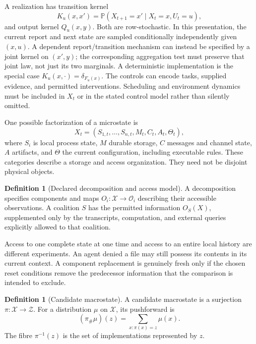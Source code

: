 \documentclass[11pt,letterpaper]{article}
\theoremstyle{plain}
\theoremstyle{definition}
\newtheorem{definition}[proposition]{Definition}
\theoremstyle{remark}
\newcommand{\X}{\mathcal X}
\newcommand{\Z}{\mathcal Z}
\newcommand{\Prob}{\mathbb P}
\newcommand{\push}{\pi_{\#}}
\begin{document}
A realization has transition kernel
\begin{equation}\label{eq:micro}
K_u(x,x')=\Prob(X_{t+1}=x'\mid X_t=x,U_t=u),
\end{equation}
and output kernel $Q_u(x,y)$. Both are row-stochastic. In this presentation, the current report and next state are sampled conditionally independently given $(x,u)$. A dependent report/transition mechanism can instead be specified by a joint kernel on $(x',y)$; the corresponding aggregation test must preserve that joint law, not just its two marginals. A deterministic implementation is the special case $K_u(x,\cdot)=\delta_{F_u(x)}$. The controls can encode tasks, supplied evidence, and permitted interventions. Scheduling and environment dynamics must be included in $X_t$ or in the stated control model rather than silently omitted.

One possible factorization of a microstate is
\[
X_t=(S_{1,t},\ldots,S_{n,t},M_t,C_t,A_t,\Theta_t),
\]
where $S_i$ is local process state, $M$ durable storage, $C$ messages and channel state, $A$ artifacts, and $\Theta$ the current configuration, including executable rules. These categories describe a storage and access organization. They need not be disjoint physical objects.

\begin{definition}[Declared decomposition and access model]\label{def:access}
A decomposition specifies components and maps $O_i:\X\to\mathcal O_i$ describing their accessible observations. A coalition $S$ has the permitted information $O_S(X)$, supplemented only by the transcripts, computation, and external queries explicitly allowed to that coalition.
\end{definition}

Access to one complete state at one time and access to an entire local history are different experiments. An agent denied a file may still possess its contents in its current context. A component replacement is genuinely fresh only if the chosen reset conditions remove the predecessor information that the comparison is intended to exclude.

\begin{definition}[Candidate macrostate]\label{def:macrostate}
A candidate macrostate is a surjection $\pi:\X\to\Z$. For a distribution $\mu$ on $\X$, its pushforward is
\[
(\push\mu)(z)=\sum_{x:\pi(x)=z}\mu(x).
\]
The fibre $\pi^{-1}(z)$ is the set of implementations represented by $z$.
\end{definition}
\end{document}
